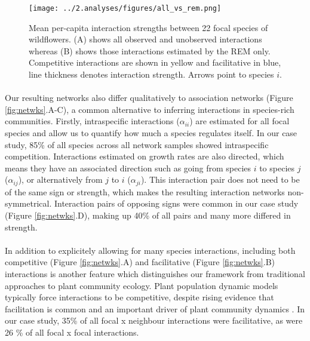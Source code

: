 \documentclass[a4,12pt]{article}
\begin{document}
    \newpage

        \begin{figure}[H]
        \begin{centering}
        \texttt{[image: ../2.analyses/figures/all\_vs\_rem.png]}
        \caption{Mean per-capita interaction strengths between 22 focal species of wildflowers. (A) shows all observed and unobserved interactions whereas (B) shows those interactions estimated by the REM only. Competitive interactions are shown in yellow and facilitative in blue, line thickness denotes interaction strength. Arrows point to species $i$.}
        \label{fig:all_vs_rem}
        \end{centering}
    \end{figure}



        \paragraph{}
    Our resulting networks also differ qualitatively to association networks (Figure \ref{fig:netwks}.A-C), a common alternative to inferring interactions in species-rich communities. Firstly, intraspecific interactions ($\alpha_{ii}$) are estimated for all focal species and allow us to quantify how much a species regulates itself. In our case study, 85\% of all species across all network samples showed intraspecific competition. Interactions estimated on growth rates are also directed, which means they have an associated direction such as going from species $i$ to species $j$ ($\alpha_{ij}$), or alternatively from $j$ to $i$ ($\alpha_{ji}$). This interaction pair does not need to be of the same sign or strength, which makes the resulting interaction networks non-symmetrical. Interaction pairs of opposing signs were common in our case study (Figure \ref{fig:netwks}.D), making up 40\% of all pairs and many more differed in strength. 

    \paragraph{}
    In addition to explicitely allowing for many species interactions, including both competitive (Figure \ref{fig:netwks}.A) and facilitative (Figure \ref{fig:netwks}.B) interactions is another feature which distinguishes our framework from traditional approaches to plant community ecology. Plant population dynamic models typically force interactions to be competitive, despite rising evidence that facilitation is common and an important driver of plant community dynamics \parencite{Brooker2008a}. In our case study, 35\% of all focal x neighbour interactions were facilitative, as were 26 \% of all focal x focal interactions.
\end{document}

